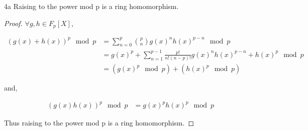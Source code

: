 \documentclass{article}
\begin{document}
\bigskip

\begin{claim}{4a}\label{Claim 4a.}
    Raising to the power mod p is a ring homomorphism.  
\end{claim}
\begin{proof}
    $\forall g, h \in F_p[X]$, 
    
    \begin{align*}
        (g(x) + h(x))^p \mod p &= \sum_{n = 0}^{p} {p \choose n} g(x)^{n} h(x)^{p - n} \mod p \\
        &= g(x)^p + \sum_{n = 1}^{p - 1} \frac{p!}{n! (n - p)!} g(x)^n h(x)^{p - n} + h(x)^p \mod p \\
        &= (g(x)^p \mod p) + (h(x)^p \mod p)
    \end{align*}


    and, 

    \begin{align*}
        (g(x)h(x))^p \mod p &= g(x)^p h(x)^p \mod p
    \end{align*}

    Thus raising to the power mod p is a ring homomorphism.   
\end{proof}
\end{document}
